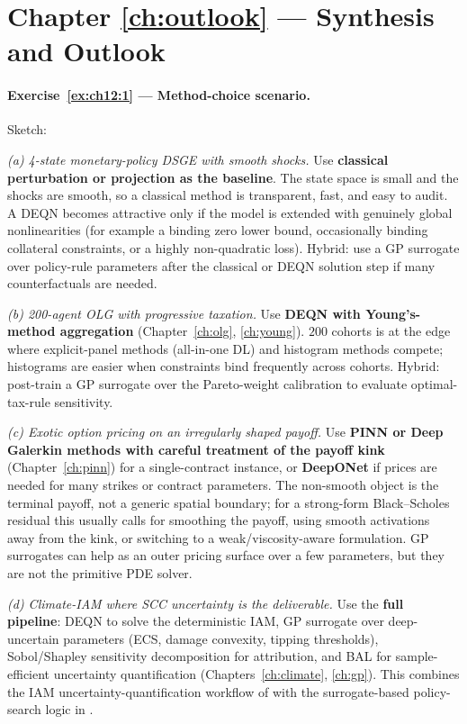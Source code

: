 \documentclass[11pt,a4paper]{report}
\begin{document}
\section{Chapter \ref{ch:outlook} --- Synthesis and Outlook}
\label{sol:ch12}

\paragraph{Exercise~\ref{ex:ch12:1} --- Method-choice scenario.}
Sketch:

\emph{(a) 4-state monetary-policy DSGE with smooth shocks.}  Use \textbf{classical perturbation or projection as the baseline}.  The state space is small and the shocks are smooth, so a classical method is transparent, fast, and easy to audit.  A DEQN becomes attractive only if the model is extended with genuinely global nonlinearities (for example a binding zero lower bound, occasionally binding collateral constraints, or a highly non-quadratic loss).  Hybrid: use a GP surrogate over policy-rule parameters after the classical or DEQN solution step if many counterfactuals are needed.

\emph{(b) 200-agent OLG with progressive taxation.}  Use \textbf{DEQN with Young's-method aggregation} (Chapter~\ref{ch:olg}, \ref{ch:young}).  $200$ cohorts is at the edge where explicit-panel methods (all-in-one DL) and histogram methods compete; histograms are easier when constraints bind frequently across cohorts.  Hybrid: post-train a GP surrogate over the Pareto-weight calibration to evaluate optimal-tax-rule sensitivity.

\emph{(c) Exotic option pricing on an irregularly shaped payoff.}  Use \textbf{PINN or Deep Galerkin methods with careful treatment of the payoff kink} (Chapter~\ref{ch:pinn}) for a single-contract instance, or \textbf{DeepONet} if prices are needed for many strikes or contract parameters.  The non-smooth object is the terminal payoff, not a generic spatial boundary; for a strong-form Black--Scholes residual this usually calls for smoothing the payoff, using smooth activations away from the kink, or switching to a weak/viscosity-aware formulation.  GP surrogates can help as an outer pricing surface over a few parameters, but they are not the primitive PDE solver.

\emph{(d) Climate-IAM where SCC uncertainty is the deliverable.}  Use the \textbf{full pipeline}: DEQN to solve the deterministic IAM, GP surrogate over deep-uncertain parameters (ECS, damage convexity, tipping thresholds), Sobol/Shapley sensitivity decomposition for attribution, and BAL for sample-efficient uncertainty quantification (Chapters~\ref{ch:climate}, \ref{ch:gp}).  This combines the IAM uncertainty-quantification workflow of \citet{friedlDeep2023} with the surrogate-based policy-search logic in \citet{kubler2025using}.
\end{document}
